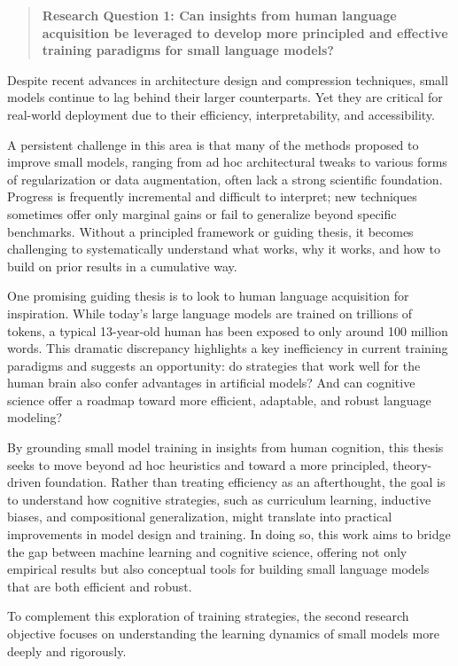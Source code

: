 \begin{quote}
    \textbf{Research Question 1: Can insights from human language acquisition be leveraged to develop more principled and effective training paradigms for small language models?}
\end{quote}

Despite recent advances in architecture design and compression techniques, small models continue to lag behind their larger counterparts. Yet they are critical for real-world deployment due to their efficiency, interpretability, and accessibility.

A persistent challenge in this area is that many of the methods proposed to improve small models, ranging from ad hoc architectural tweaks to various forms of regularization or data augmentation, often lack a strong scientific foundation. Progress is frequently incremental and difficult to interpret; new techniques sometimes offer only marginal gains or fail to generalize beyond specific benchmarks. Without a principled framework or guiding thesis, it becomes challenging to systematically understand what works, why it works, and how to build on prior results in a cumulative way.

One promising guiding thesis is to look to human language acquisition for inspiration. While today's large language models are trained on trillions of tokens, a typical 13-year-old human has been exposed to only around 100 million words. This dramatic discrepancy highlights a key inefficiency in current training paradigms and suggests an opportunity: do strategies that work well for the human brain also confer advantages in artificial models? And can cognitive science offer a roadmap toward more efficient, adaptable, and robust language modeling?

By grounding small model training in insights from human cognition, this thesis seeks to move beyond ad hoc heuristics and toward a more principled, theory-driven foundation. Rather than treating efficiency as an afterthought, the goal is to understand how cognitive strategies, such as curriculum learning, inductive biases, and compositional generalization, might translate into practical improvements in model design and training. In doing so, this work aims to bridge the gap between machine learning and cognitive science, offering not only empirical results but also conceptual tools for building small language models that are both efficient and robust.

To complement this exploration of training strategies, the second research objective focuses on understanding the learning dynamics of small models more deeply and rigorously.

